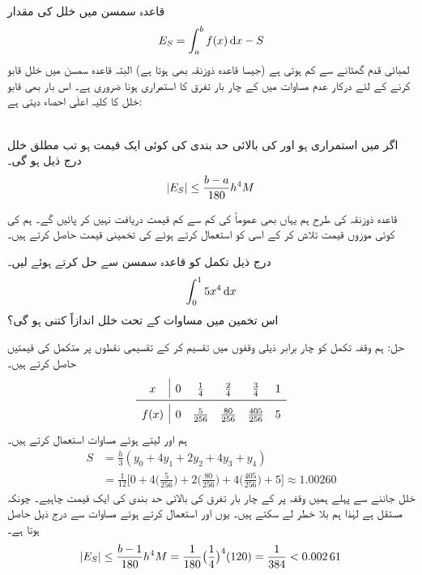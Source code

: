قاعدہ سمسن میں خلل کی مقدار
\begin{align}\label{مساوات_تکمل_قاعدہ_سمسن_خلل_تعریف}
E_S=\int_a^bf(x)\dif x-S
\end{align} 
لمبائی قدم گھٹانے سے کم ہوتی ہے (جیسا قاعدہ ذوزنقہ بھی ہوتا ہے)  البتہ قاعدہ سمسن میں خلل قابو کرنے کے لئے درکار عدم مساوات میں  کے چار بار تفرق کا  استمراری ہونا ضروری ہے۔ اس بار بھی قابو خلل کا کلیہ اعلٰی احصاء دیتی ہے:

\\
اگر  میں  استمراری ہو اور  کی بالائی حد بندی کی کوئی ایک قیمت  ہو تب  مطلق خلل درج ذیل ہو گی۔
\begin{align}\label{مساوات_تکمل_قاعدہ_سمسن_خلل}
\abs{E_S}\le \frac{b-a}{180}h^4M
\end{align}

قاعدہ ذوزنقہ کی طرح ہم یہاں بھی عموماً  کی کم سے کم قیمت دریافت نہیں کر پائیں گے۔ ہم  کی کوئی موزوں قیمت تلاش کر کے اسی کو استعمال کرتے ہوئے  کی تخمینی قیمت حاصل کرتے ہیں۔

درج ذیل تکمل کو قاعدہ سمسن سے حل کرتے ہوئے  لیں۔
\begin{align*}
\int_0^1 5x^4\dif x
\end{align*}
اس تخمین میں مساوات  کے تحت خلل اندازاً کتنی ہو گی؟

حل:\quad
ہم وقفہ تکمل کو چار برابر ذیلی وقفوں میں تقسیم کر کے تقسیمی نقطوں پر متکمل  کی قیمتیں حاصل کرتے ہیں۔
\begin{align*}
\renewcommand{\arraystretch}{1.5} 
\begin{array}{c|ccccc}
x&0&\frac{1}{4}&\frac{2}{4}&\frac{3}{4}&1\\
\midrule
f(x)&0&\frac{5}{256}&\frac{80}{256}&\frac{405}{256}&5
\end{array}
\end{align*}
ہم  اور  لیتے ہوئے مساوات  استعمال کرتے ہیں۔
\begin{align*}
S&=\frac{h}{3}(y_0+4y_1+2y_2+4y_3+y_4)\\
&=\frac{1}{12}\big[0+4\big(\frac{5}{256}\big)+2\big(\frac{80}{256}\big)+4\big(\frac{405}{256}\big)+5\big]\approx \num{1.00260}
\end{align*}
خلل جاننے سے پہلے ہمیں وقفہ  پر   کے چار بار تفرق  کی بالائی حد بندی کی ایک قیمت  چاہیے۔ چونکہ  مستقل ہے لہٰذا ہم بلا خطر  لے سکتے ہیں۔ یوں  اور  استعمال کرتے ہوئے مساوات  سے درج ذیل حاصل ہوتا ہے۔
\begin{align*}
\abs{E_S}\le\frac{b-1}{180}h^4M=\frac{1}{180}\big(\frac{1}{4}\big)^4(120)=\frac{1}{384}<\num{0.00261} 
\end{align*}

